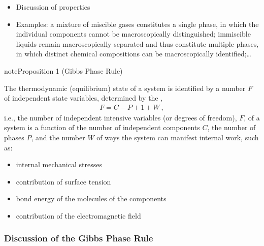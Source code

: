 \documentclass[letterpaper,10pt,english]{jupyterBook}
\begin{document}
\sphinxAtStartPar
{}
\begin{itemize}
\item {} 
\sphinxAtStartPar
Discussion of properties

\item {} 
\sphinxAtStartPar
Examples: a mixture of miscible gases constitutes a single phase, in which the individual components cannot be macroscopically distinguished; immiscible liquids remain macroscopically separated and thus constitute multiple phases, in which distinct chemical compositions can be macroscopically identified;…

\end{itemize}
\label{ch/principles-gibbs-phase-rule:proposition-4}
\begin{sphinxadmonition}{note}{Proposition 1 (Gibbs Phase Rule)}



\sphinxAtStartPar
The thermodynamic (equilibrium) state of a system is identified by a number \(F\) of independent  state variables, determined by the ,
\begin{equation*}
\begin{split}F = C - P + 1 + W \ ,\end{split}
\end{equation*}
\sphinxAtStartPar
i.e., the number of independent intensive variables (or degrees of freedom), \(F\), of a system is a function of the number of independent components \(C\), the number of phases \(P\), and the number \(W\) of ways the system can manifest internal work, such as:
\begin{itemize}
\item {} 
\sphinxAtStartPar
internal mechanical stresses

\item {} 
\sphinxAtStartPar
contribution of surface tension

\item {} 
\sphinxAtStartPar
bond energy of the molecules of the components

\item {} 
\sphinxAtStartPar
contribution of the electromagnetic field

\end{itemize}
\end{sphinxadmonition}
\subsubsection*{Discussion of the Gibbs Phase Rule}
\end{document}
